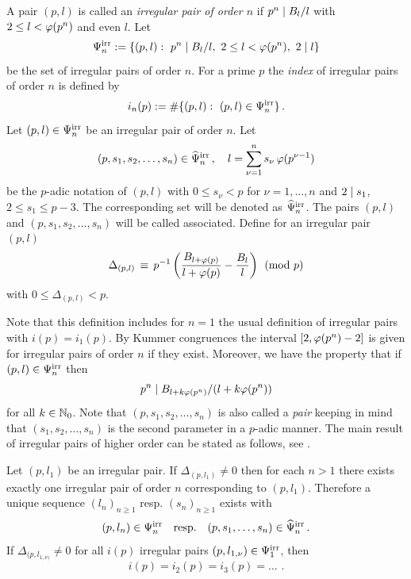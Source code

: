 \documentclass[12pt,english]{article}
\begin{document}
\begin{defin} \label{def-ordn-irrpair}
A pair $(p,l)$ is called an \textsl{irregular pair of order $n$} if
$p^n \mid B_l/l$ with $2 \leq l < \varphi(p^n)$ and even $l$.
Let
\[
   \Psi^{\rm irr}_n := \{ (p, l) :\,\, p^n \mid B_l/l, \,\,
     2 \leq l < \varphi(p^n), \,\,  2 \mid l \}
\]
be the set of irregular pairs of order $n$. For a prime $p$
the \textsl{index} of irregular pairs of order $n$ is defined by
\[
    i_n(p) := \# \{ (p,l) :\,\, (p,l) \in \Psi^{\rm irr}_n \} \,.
\]
Let $(p,l) \in \Psi^{\rm irr}_n$ be an irregular pair of order $n$.
Let
\[
   (p,s_1,s_2, \ldots, s_n) \in \widehat{\Psi}^{\rm irr}_n \,, \quad
      l = \sum_{\nu=1}^{n} s_\nu \, \varphi( p^{\nu-1} )
\]
be the $p$-adic notation of $(p,l)$
with $0 \leq s_\nu < p$ for $\nu = 1,\ldots,n$ and $2 \mid s_1$, $2 \leq s_1 \leq p-3$.
The corresponding set will be denoted as $\widehat{\Psi}^{\rm irr}_n$. The pairs
$(p,l)$ and $(p,s_1,s_2, \ldots, s_n)$ will be called associated.
Define for an irregular pair $(p,l)$
\[
    \Delta_{(p,l)} \, \equiv \, p^{-1} \left(
       \frac{B_{l + \varphi(p)}}{l + \varphi(p)} - \frac{B_l}{l} \right) \pmod{p}
\]
with $0 \leq \Delta_{(p,l)} < p$.
\end{defin}
\bigskip

Note that this definition includes for $n=1$ the usual definition of irregular pairs
with $i(p) = i_1(p)$. By Kummer congruences  the interval
$[2,\varphi(p^n)-2]$ is given for irregular pairs of order $n$ if they exist.
Moreover, we have the property that if $(p,l) \in \Psi^{\rm irr}_n$ then
\begin{equation} \label{eqn-succ-pdiv-n}
   p^n \mid B_{l+k \varphi(p^n)}/(l+k \varphi(p^n))
\end{equation}
for all $k \in \mathbb{N}_0$. Note that $(p,s_1,s_2, \ldots, s_n)$ is also called a \textsl{pair}
keeping in mind that $(s_1,s_2, \ldots, s_n)$ is the second parameter in a $p$-adic
manner. The main result of irregular pairs of higher order can be stated as follows,
see \cite[Theorem 3.1, p.~8]{kellner04irrpowbn}.

\begin{theorem} \label{theor-irrpair-main}
Let $(p,l_1)$ be an irregular pair. If $\Delta_{(p,l_1)} \neq 0$ then
for each $n > 1$ there exists exactly one irregular pair of order $n$
corresponding to $(p,l_1)$. Therefore a unique sequence
$(l_n)_{n \geq 1}$ resp. $(s_n)_{n \geq 1}$ exists with
\[
   (p,l_n) \in \Psi^{\rm irr}_n \quad \mbox{resp.} \quad (p,s_1,\ldots,s_n) \in \widehat{\Psi}^{\rm irr}_n \,.
\]
If $\Delta_{(p,l_{1,\nu)}} \neq 0$ for all $i(p)$ irregular pairs $(p,l_{1,\nu}) \in \Psi^{\rm irr}_1$, then
\[
   i(p) = i_2(p) = i_3(p) = \ldots \,\,.
\]
\end{theorem}
\end{document}
